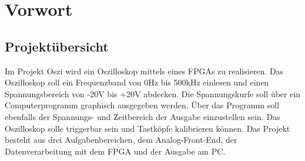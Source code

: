 \section{Vorwort}

\subsection{Projektübersicht}
Im Projekt Oszi wird ein Oszilloskop mittels eines FPGAs zu realisieren. Das Oszilloskop soll ein Frequenzband von 0Hz bis 500kHz einlesen und einen Spannungsbereich von -20V bis +20V abdecken. Die Spannungskurfe soll über ein Computerprogramm graphisch ausgegeben werden. Über das Programm soll ebenfalls der Spannungs- und Zeitbereich der Ausgabe einzustellen sein. Das Oszilloskop solle triggerbar sein und Tastköpfe kalibrieren können. Das Projekt besteht aus drei Aufgabenbereichen, dem Analog-Front-End, der Datenverarbeitung mit dem FPGA und der Ausgabe am PC.
